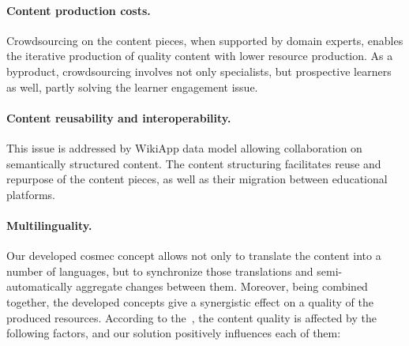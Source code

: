 \documentclass[PhD, Submit, ngerman,UKenglish,table]{scrbook}
\begin{document}
\paragraph{Content production costs.} Crowdsourcing on the content pieces, when supported by domain experts, enables the iterative production of quality content with lower resource production. 
As a byproduct, crowdsourcing involves not only specialists, but prospective learners as well, partly solving the learner engagement issue.
\paragraph{Content reusability and interoperability.} This issue is addressed by WikiApp data model allowing collaboration on semantically structured content. 
The content structuring facilitates reuse and repurpose of the content pieces, as well as their migration between educational platforms.
\paragraph{Multilinguality.} Our developed \gls{cosmec} concept allows not only to translate the content into a number of languages, but to synchronize those translations and semi-automatically aggregate changes between them.
Moreover, being combined together, the developed concepts give a synergistic effect on a quality of the produced resources.
According to the~\cite{sahar_vahdati_2015_14756}, the content quality is affected by the following factors, and our solution positively influences each of them:
\end{document}
